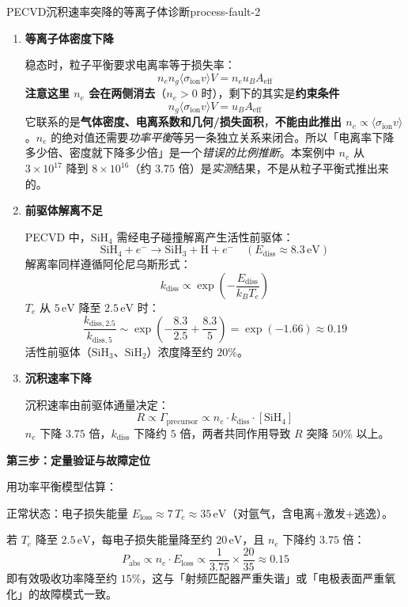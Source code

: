 \documentclass[12pt,a4paper,openany,oneside]{book}
\begin{document}
\begin{example}{PECVD沉积速率突降的等离子体诊断}{process-fault-2}
\begin{enumerate}
    \item \textbf{等离子体密度下降}

    稳态时，粒子平衡要求电离率等于损失率：
    \[
    n_e n_g \langle \sigma_{\text{ion}} v \rangle V = n_e u_B A_{\text{eff}}
    \]
    \textbf{注意这里 $n_e$ 会在两侧消去}（$n_e>0$ 时），剩下的其实是\textbf{约束条件}
    \[
    n_g \langle \sigma_{\text{ion}} v \rangle V = u_B A_{\text{eff}}
    \]
    它联系的是\textbf{气体密度、电离系数和几何/损失面积}，\textbf{不能由此推出 $n_e\propto\langle\sigma_{\text{ion}}v\rangle$}。$n_e$ 的绝对值还需要\emph{功率平衡}等另一条独立关系来闭合。所以「电离率下降多少倍、密度就下降多少倍」是一个\emph{错误的比例推断}。本案例中 $n_e$ 从 $3\times10^{17}$ 降到 $8\times10^{16}$（约 $3.75$ 倍）是\emph{实测}结果，不是从粒子平衡式推出来的。

    \item \textbf{前驱体解离不足}

    PECVD 中，$\mathrm{SiH}_4$ 需经电子碰撞解离产生活性前驱体：
    \[
    \mathrm{SiH}_4 + e^- \rightarrow \mathrm{SiH}_3 + \mathrm{H} + e^- \quad (E_{\text{diss}} \approx 8.3\,\mathrm{eV})
    \]
    解离率同样遵循阿伦尼乌斯形式：
    \[
    k_{\text{diss}} \propto \exp\left(-\frac{E_{\text{diss}}}{k_B T_e}\right)
    \]
    $T_e$ 从 $5\,\mathrm{eV}$ 降至 $2.5\,\mathrm{eV}$ 时：
    \[
    \frac{k_{\text{diss},2.5}}{k_{\text{diss},5}} \sim \exp\left(-\frac{8.3}{2.5} + \frac{8.3}{5}\right) = \exp(-1.66) \approx 0.19
    \]
    活性前驱体（$\mathrm{SiH}_3$、$\mathrm{SiH}_2$）浓度降至约 $20\%$。

    \item \textbf{沉积速率下降}
    
    沉积速率由前驱体通量决定：
    \[
    R \propto \Gamma_{\text{precursor}} \propto n_e \cdot k_{\text{diss}} \cdot [\mathrm{SiH}_4]
    \]
    $n_e$ 下降 $3.75$ 倍，$k_{\text{diss}}$ 下降约 $5$ 倍，两者共同作用导致 $R$ 突降 $50\%$ 以上。
\end{enumerate}

\textbf{第三步：定量验证与故障定位}

用功率平衡模型估算：

正常状态：电子损失能量 $E_{\text{loss}} \approx 7\,T_e \approx 35\,\mathrm{eV}$（对氩气，含电离+激发+逃逸）。

若 $T_e$ 降至 $2.5\,\mathrm{eV}$，每电子损失能量降至约 $20\,\mathrm{eV}$，且 $n_e$ 下降约 $3.75$ 倍：
\[
P_{\text{abs}} \propto n_e \cdot E_{\text{loss}} \propto \frac{1}{3.75} \times \frac{20}{35} \approx 0.15
\]
即有效吸收功率降至约 $15\%$，这与「射频匹配器严重失谐」或「电极表面严重氧化」的故障模式一致。


\end{example}
\end{document}
